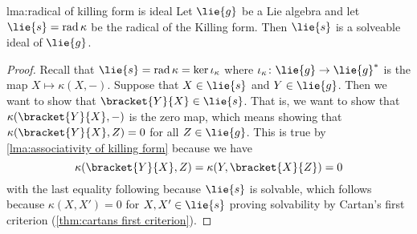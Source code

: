 \documentclass[fleqn]{NotesClass}
\DeclareMathOperator{\rad}{rad}
\begin{document}
    \begin{lma}{}{lma:radical of killing form is ideal}
        Let \(\lie{g}\) be a Lie algebra and let \(\lie{s} = \rad\kappa\) be the radical of the Killing form.
        Then \(\lie{s}\) is a solveable ideal of \(\lie{g}\).
        \begin{proof}
            Recall that \(\lie{s} = \rad\kappa = \ker \iota_\kappa\) where \(\iota_\kappa \colon\lie{g} \to \lie{g}^*\) is the map \(X \mapsto \kappa(X, -)\).
            Suppose that \(X \in \lie{s}\) and \(Y \in \lie{g}\).
            Then we want to show that \(\bracket{Y}{X} \in \lie{s}\).
            That is, we want to show that \(\kappa(\bracket{Y}{X}, -)\) is the zero map, which means showing that \(\kappa(\bracket{Y}{X}, Z) = 0\) for all \(Z \in \lie{g}\).
            This is true by \cref{lma:associativity of killing form} because we have
            \begin{equation}
                \kappa(\bracket{Y}{X}, Z) = \kappa(Y, \bracket{X}{Z}) = 0
            \end{equation}
            with the last equality following because \(\lie{s}\) is solvable, which follows because \(\kappa(X, X') = 0\) for \(X, X' \in \lie{s}\) proving solvability by Cartan's first criterion (\cref{thm:cartans first criterion}).
        \end{proof}
    \end{lma}
    
\end{document}
